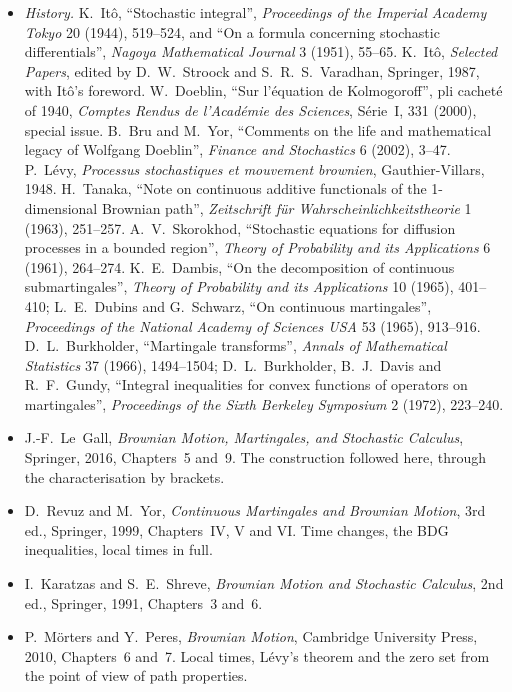 \begin{itemize}
\item \emph{History.} K.~It\^o, ``Stochastic integral'', \emph{Proceedings of the Imperial Academy Tokyo} 20 (1944), 519--524, and ``On a formula concerning stochastic differentials'', \emph{Nagoya Mathematical Journal} 3
(1951), 55--65. K.~It\^o, \emph{Selected Papers}, edited by D.~W.~Stroock and S.~R.~S.~Varadhan, Springer, 1987, with It\^o's foreword. W.~Doeblin, ``Sur l'\'equation de Kolmogoroff'', pli cachet\'e of 1940,
\emph{Comptes Rendus de l'Acad\'emie des Sciences}, S\'erie~I, 331 (2000), special issue. B.~Bru and M.~Yor, ``Comments on the life and mathematical legacy of Wolfgang Doeblin'', \emph{Finance and Stochastics} 6
(2002), 3--47. P.~L\'evy, \emph{Processus stochastiques et mouvement brownien}, Gauthier-Villars, 1948. H.~Tanaka, ``Note on continuous additive functionals of the 1-dimensional Brownian path'',
\emph{Zeitschrift f\"ur Wahrscheinlichkeitstheorie} 1 (1963), 251--257. A.~V.~Skorokhod, ``Stochastic equations for diffusion processes in a bounded region'', \emph{Theory of Probability and its Applications} 6 (1961),
264--274. K.~E.~Dambis, ``On the decomposition of continuous submartingales'', \emph{Theory of Probability and its Applications} 10 (1965), 401--410; L.~E.~Dubins and G.~Schwarz, ``On continuous martingales'',
\emph{Proceedings of the National Academy of Sciences USA} 53 (1965), 913--916. D.~L.~Burkholder, ``Martingale transforms'', \emph{Annals of Mathematical Statistics} 37 (1966), 1494--1504;
D.~L.~Burkholder, B.~J.~Davis and R.~F.~Gundy, ``Integral inequalities for convex functions of operators on martingales'', \emph{Proceedings of the Sixth Berkeley Symposium} 2 (1972), 223--240.
\item J.-F.~Le~Gall, \emph{Brownian Motion, Martingales, and Stochastic Calculus}, Springer, 2016, Chapters~5 and~9. The construction followed here, through the characterisation by brackets.
\item D.~Revuz and M.~Yor, \emph{Continuous Martingales and Brownian Motion}, 3rd ed., Springer, 1999, Chapters~IV, V and VI. Time changes, the BDG inequalities, local times in full.
\item I.~Karatzas and S.~E.~Shreve, \emph{Brownian Motion and Stochastic Calculus}, 2nd ed., Springer, 1991, Chapters~3 and~6.
\item P.~M\"orters and Y.~Peres, \emph{Brownian Motion}, Cambridge University Press, 2010, Chapters~6 and~7. Local times, L\'evy's theorem and the zero set from the point of view of path properties.
\end{itemize}
